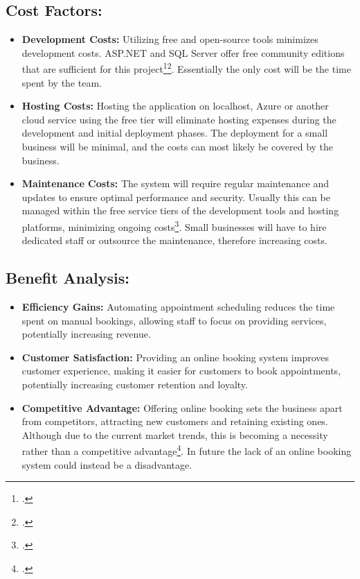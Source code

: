 \subsection*{Cost Factors:}
\label{subsec:ef-cost-factors}

\begin{itemize}
    \item \textbf{Development Costs:} Utilizing free and open-source tools minimizes development costs. ASP.NET and SQL Server offer free community editions that are sufficient for this project\footcite[][]{missing}\footcite[][]{missing}. Essentially the only cost will be the time spent by the team.
    \item \textbf{Hosting Costs:} Hosting the application on localhost, Azure or another cloud service using the free tier will eliminate hosting expenses during the development and initial deployment phases.
    The deployment for a small business will be minimal, and the costs can most likely be covered by the business.
    \item \textbf{Maintenance Costs:} The system will require regular maintenance and updates to ensure optimal performance and security. Usually this can be managed within the free service tiers of the development tools and hosting platforms, minimizing ongoing costs\footcite[][]{missing}. Small businesses will have to hire dedicated staff or outsource the maintenance, therefore increasing costs.
\end{itemize}

\subsection*{Benefit Analysis:}
\label{subsec:ef-benefit-analysis}
\begin{itemize}
    \item \textbf{Efficiency Gains:} Automating appointment scheduling reduces the time spent on manual bookings, allowing staff to focus on providing services, potentially increasing revenue.
    \item \textbf{Customer Satisfaction:} Providing an online booking system improves customer experience, making it easier for customers to book appointments, potentially increasing customer retention and loyalty.
    \item \textbf{Competitive Advantage:} Offering online booking sets the business apart from competitors, attracting new customers and retaining existing ones. Although due to the current market trends, this is becoming a necessity rather than a competitive advantage\footcite[][]{missing}. In future the lack of an online booking system could instead be a disadvantage.
\end{itemize}

